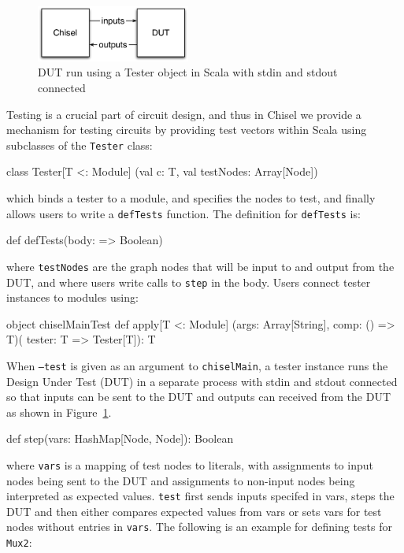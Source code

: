 \documentclass[10pt,twocolumn]{article}
\def\code#1{{\small\tt #1}}
\begin{document}
\begin{figure}
\begin{center}
\includegraphics[width=0.45\textwidth]{../tutorial/figs/DUT.pdf}
\end{center}
\caption{DUT run using a Tester object in Scala with stdin and stdout connected}
\label{fig:dut}
\end{figure}
 
Testing is a crucial part of circuit design, 
and thus in Chisel we provide a mechanism for
testing circuits by providing test vectors within Scala using
subclasses of the \code{Tester} class:

\begin{scala}
class Tester[T <: Module]
  (val c: T, val testNodes: Array[Node])
\end{scala}

\noindent
which binds a tester to a module, and specifies the nodes to test,
and finally allows users to write a \code{defTests} function.
The definition for \code{defTests} is:

\begin{scala}
def defTests(body: => Boolean)
\end{scala}

\noindent
where \code{testNodes} are the graph nodes that will be input to and
output from the DUT, and where
users write calls to \code{step} in the body.  Users connect tester
instances to modules using:

\begin{scala}
object chiselMainTest {
  def apply[T <: Module]
    (args: Array[String], comp: () => T)(
     tester: T => Tester[T]): T
}
\end{scala}

\noindent
When \code{--test} is given as an argument to \code{chiselMain}, a
tester instance runs the Design Under Test (DUT) in a separate
process with stdin and stdout connected so that inputs can be sent to
the DUT and outputs can received from the DUT as shown in
Figure~\ref{fig:dut}.
\noindent

\begin{scala}
def step(vars: HashMap[Node, Node]): Boolean
\end{scala}

\noindent
where \code{vars} is a mapping of test nodes to literals, 
with assignments to input nodes being sent to the DUT and assignments to
non-input nodes being interpreted as expected values.
\code{test} first sends inputs specifed in vars, steps the DUT and then either
compares expected values from vars or sets vars for test nodes without
entries in \code{vars}.
The following is an example for defining tests for \code{Mux2}:
\end{document}
